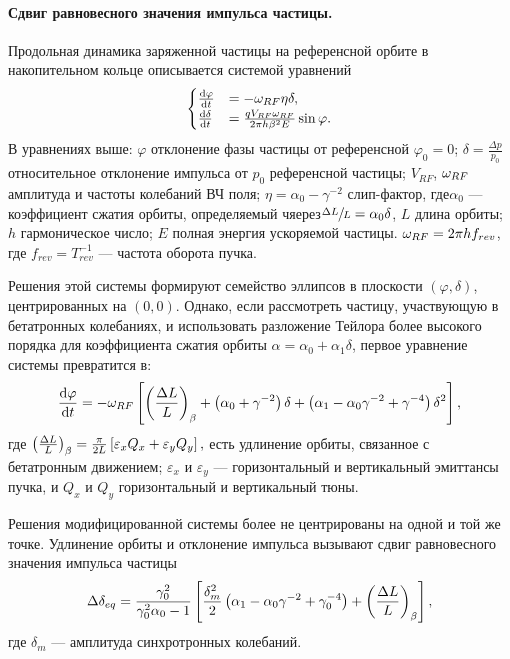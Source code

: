 \paragraph{Сдвиг равновесного значения импульса частицы.}
Продольная динамика заряженной частицы на референсной орбите в
накопительном кольце описывается системой уравнений
\begin{equation*}
	\begin{cases}
		\frac{\mathrm{d} {\varphi}}{\mathrm{d} t} &= -\omega_{RF}\eta\delta, \\
		\frac{\mathrm{d} {\delta}}{\mathrm{d} t} &= \frac{q V_{RF}\omega_{RF}}{2\pi h\beta^2E}\sin\varphi.
	\end{cases}
\end{equation*}
В уравнениях выше: $\varphi$ отклонение фазы частицы от референсной
$\varphi_0 = 0$; $\delta = \frac{\Delta p}{p_0}$ относительное
отклонение импульса от $p_0$ референсной частицы; $V_{RF}$, $\omega_{RF}$
амплитуда и частоты колебаний ВЧ поля; $\eta = \alpha_0 - \gamma^{-2}$
слип-фактор, где$\alpha_0$ --- коэффициент сжатия орбиты, определяемый
чяерез$\sfrac{\Delta L}{L} = \alpha_0\delta$, $L$ длина орбиты; $h$
гармоническое число; $E$ полная энергия ускоряемой частицы. $\omega_{RF} =
2\pi h f_{rev}$, где $f_{rev}=T_{rev}^{-1}$ --- частота оборота пучка.

Решения этой системы формируют семейство эллипсов в плоскости
$(\varphi, \delta)$, центрированных на $(0,0)$. Однако, если
рассмотреть частицу, участвующую в бетатронных колебаниях, и
использовать разложение Тейлора более высокого порядка для
коэффициента сжатия орбиты $\alpha = \alpha_0 + \alpha_1\delta$,
первое уравнение системы превратится в:~\cite[стр.~2579]{Senichev:IPAC13}
\[
\ddt{\varphi} = -\w_{RF} \bkt*{\bkt{\frac{\Delta L}{L}}_\beta + \bkt{\alpha_0 + \gamma^{-2}}\delta + \bkt{\alpha_1 - \alpha_0\gamma^{-2} + \gamma^{-4}}\delta^2},
\]
где $\bkt{\frac{\Delta L}{L}}_\beta =
\frac{\pi}{2L}\bkt*{\varepsilon_xQ_x + \varepsilon_yQ_y},$ есть
удлинение орбиты, связанное с бетатронным движением; $\varepsilon_x$ и
$\varepsilon_y$ --- горизонтальный и вертикальный эмиттансы пучка, и
$Q_x$ и $Q_y$ горизонтальный и вертикальный тюны.~\cite[стр.~2580]{Senichev:IPAC13}

Решения модифицированной системы более не центрированы на одной и той
же точке. Удлинение орбиты и отклонение импульса вызывают сдвиг
равновесного значения импульса частицы~\cite[стр.~2581]{Senichev:IPAC13}
\begin{equation}\label{eq:EquLevMom_shift}
\Delta\delta_{eq} = \frac{\gamma_0^2}{\gamma_0^2\alpha_0 - 1}\bkt*{\frac{\delta_m^2}{2}\bkt{\alpha_1 - \alpha_0\gamma^{-2} + \gamma_0^{-4}} + \bkt{\frac{\Delta L}{L}}_\beta},
\end{equation}
где $\delta_m$ --- амплитуда синхротронных колебаний.

